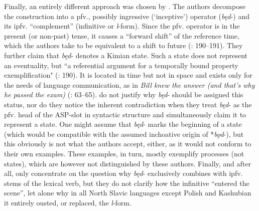 \documentclass[output=paper,colorlinks,citecolor=brown]{langscibook}
\begin{document}
Finally, an entirely different approach was chosen by \citet{blaszczak_etal_2014}. The authors decompose the construction into a pfv., possibly ingressive (‘inceptive’) operator (\textit{będ}-) and its ipfv. ``complement'' (infinitive or \textit{l}-form). Since the pfv. operator is in the present (or non-past) tense, it causes a “forward shift” of the reference time, which the authors take to be equivalent to a shift to future (\citeyear{blaszczak_etal_2014}: 190--191). They further claim that \textit{będ}- denotes a Kimian state. Such a state does not represent an eventuality, but ``a referential argument for a temporally bound property exemplification" (\citeyear{blaszczak_etal_2014}: 190). It is located in time but not in space and exists only for the needs of language communication, as in \textit{Bill knew the answer (and that’s why he passed the exam)} (\cite{Tatevosov2016}: 63--65). \citeauthor{blaszczak_etal_2014} do not justify why \textit{będ}- should be assigned this status, nor do they notice the inherent contradiction when they treat \textit{będ}- as the pfv. head of the ASP-slot in syntactic structure and simultaneously claim it to represent a state. One might assume that \textit{będ}- marks the beginning of a state (which would be compatible with the assumed inchoative origin of *\textit{bǫd}-), but this obviously is not what the authors accept, either, as it would not conform to their own examples. These examples, in turn, mostly exemplify processes (not states), which are however not distinguished by these authors. Finally, and after all, \citeauthor{blaszczak_etal_2014} only concentrate on the question why \textit{będ}- exclusively combines with ipfv. stems of the lexical verb, but they do not clarify how the infinitive “entered the scene”, let alone why in all North Slavic languages except Polish and Kashubian it entirely ousted, or replaced, the \textit{l}-form. 
\end{document}
